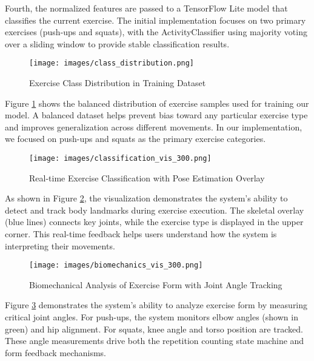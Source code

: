 \documentclass[11pt]{article}
\begin{document}
Fourth, the normalized features are passed to a TensorFlow Lite model that classifies the current exercise. The initial implementation focuses on two primary exercises (push-ups and squats), with the ActivityClassifier using majority voting over a sliding window to provide stable classification results.
\begin{figure}[htbp]
    \centering
    \texttt{[image: images/class\_distribution.png]}
    \caption{Exercise Class Distribution in Training Dataset}
    \label{fig:class_distribution}
\end{figure}

Figure \ref{fig:class_distribution} shows the balanced distribution of exercise samples used for training our model. A balanced dataset helps prevent bias toward any particular exercise type and improves generalization across different movements. In our implementation, we focused on push-ups and squats as the primary exercise categories.


\begin{figure}[htbp]
    
\end{figure}

\begin{figure}[htbp]
    \centering
    \texttt{[image: images/classification\_vis\_300.png]}
    \caption{Real-time Exercise Classification with Pose Estimation Overlay}
    \label{fig:classification_vis}
\end{figure}

As shown in Figure \ref{fig:classification_vis}, the visualization demonstrates the system's ability to detect and track body landmarks during exercise execution. The skeletal overlay (blue lines) connects key joints, while the exercise type is displayed in the upper corner. This real-time feedback helps users understand how the system is interpreting their movements.

\begin{figure}[htbp]
    \centering
    \texttt{[image: images/biomechanics\_vis\_300.png]}
    \caption{Biomechanical Analysis of Exercise Form with Joint Angle Tracking}
    \label{fig:biomechanics_vis}
\end{figure}

Figure \ref{fig:biomechanics_vis} demonstrates the system's ability to analyze exercise form by measuring critical joint angles. For push-ups, the system monitors elbow angles (shown in green) and hip alignment. For squats, knee angle and torso position are tracked. These angle measurements drive both the repetition counting state machine and form feedback mechanisms.
\end{document}
